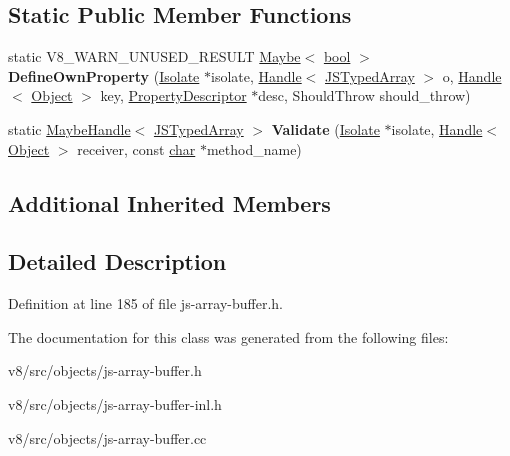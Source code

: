 \subsection*{Static Public Member Functions}
\begin{DoxyCompactItemize}
\item 
\mbox{\label{classv8_1_1internal_1_1JSTypedArray_a01c956929cbc4db0d891b83739741149}} 
static V8\+\_\+\+W\+A\+R\+N\+\_\+\+U\+N\+U\+S\+E\+D\+\_\+\+R\+E\+S\+U\+LT \mbox{\hyperlink{classv8_1_1Maybe}{Maybe}}$<$ \mbox{\hyperlink{classbool}{bool}} $>$ {\bfseries Define\+Own\+Property} (\mbox{\hyperlink{classv8_1_1internal_1_1Isolate}{Isolate}} $\ast$isolate, \mbox{\hyperlink{classv8_1_1internal_1_1Handle}{Handle}}$<$ \mbox{\hyperlink{classv8_1_1internal_1_1JSTypedArray}{J\+S\+Typed\+Array}} $>$ o, \mbox{\hyperlink{classv8_1_1internal_1_1Handle}{Handle}}$<$ \mbox{\hyperlink{classv8_1_1internal_1_1Object}{Object}} $>$ key, \mbox{\hyperlink{classv8_1_1internal_1_1PropertyDescriptor}{Property\+Descriptor}} $\ast$desc, Should\+Throw should\+\_\+throw)
\item 
\mbox{\label{classv8_1_1internal_1_1JSTypedArray_ab7a245c9b7a5574324dcb1c7fb4c210b}} 
static \mbox{\hyperlink{classv8_1_1internal_1_1MaybeHandle}{Maybe\+Handle}}$<$ \mbox{\hyperlink{classv8_1_1internal_1_1JSTypedArray}{J\+S\+Typed\+Array}} $>$ {\bfseries Validate} (\mbox{\hyperlink{classv8_1_1internal_1_1Isolate}{Isolate}} $\ast$isolate, \mbox{\hyperlink{classv8_1_1internal_1_1Handle}{Handle}}$<$ \mbox{\hyperlink{classv8_1_1internal_1_1Object}{Object}} $>$ receiver, const \mbox{\hyperlink{classchar}{char}} $\ast$method\+\_\+name)
\end{DoxyCompactItemize}
\subsection*{Additional Inherited Members}


\subsection{Detailed Description}


Definition at line 185 of file js-\/array-\/buffer.\+h.



The documentation for this class was generated from the following files\+:\begin{DoxyCompactItemize}
\item 
v8/src/objects/js-\/array-\/buffer.\+h\item 
v8/src/objects/js-\/array-\/buffer-\/inl.\+h\item 
v8/src/objects/js-\/array-\/buffer.\+cc\end{DoxyCompactItemize}
